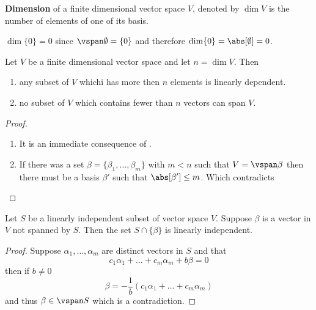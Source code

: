 \begin{definition}[Dimension]
    \textbf{Dimension} of a finite dimensional vector space \(V\), denoted by \( \dim V\) is the number of elements of one of its basis.
\end{definition}

\begin{example}
    \(\dim \{0\} = 0\) since \(\vspan \emptyset = \{0\}\) and therefore \(\dim \{0\} = \abs[\emptyset ]= 0\).
\end{example}

\begin{corollary}
    Let \(V\) be a finite dimensional vector space and let \( n = \dim V\). Then
    \begin{enumerate}
        \item any subset of \(V\) whichi has more then \(n\) elements is linearly dependent.
        \item no subset of \(V\) which contains fewer than \(n\) vectors can span \(V\).
    \end{enumerate}
\end{corollary}

\begin{proof}
    \begin{enumerate}
        \item It is an immediate consequence of .
        \item If there was a set \(\beta = \{\beta_1 , \dots , \beta_m\}\) with \(m < n\) such that \(V = \vspan \beta\) then there must be a basis \(\beta'\) such that \(\abs[\beta'] \leq m\). Which contradicts 
    \end{enumerate}
\end{proof}

\begin{lemma} \label{lm:MakingBasis}
    Let \(S\) be a linearly independent subset of vector space \(V\). Suppose \(\beta\) is a vector in \(V\) not spanned by \(S\). Then the set \(S \cap \{\beta\}\) is linearly independent.
\end{lemma}

\begin{proof}
    Suppose \(\alpha_1, \dots ,\alpha_m \) are distinct vectors in \(S\) and that
    \begin{equation}
        c_1 \alpha_1 + \dots + c_m \alpha_m + b \beta = 0
    \end{equation}
    then if \(b \neq 0\)
    \begin{equation*}
        \beta =-\dfrac{1}{b} (c_1 \alpha_1 + \dots + c_m \alpha_m )
    \end{equation*}
    and thus \(\beta \in \vspan S\) which is a contradiction.
\end{proof}


